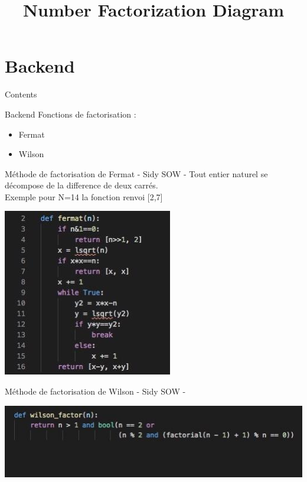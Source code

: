 \documentclass[aspectratio=169]{beamer}
\title{Number Factorization Diagram}
\begin{document}
\section{Backend}
\begin{frame}
	\maketitle 
\end{frame}

\begin{frame}{Contents}
	\tableofcontents 
\end{frame}

\begin{frame}[fragile=singleslide]{Backend}
	Fonctions de factorisation :
	\begin{itemize}
		\item Fermat 
		\item Wilson
	\end{itemize}
	\end{frame}
	\begin{frame}[fragile=singleslide]{Méthode de factorisation de Fermat \qquad \qquad \qquad - Sidy SOW -}
	Tout entier naturel se décompose de la difference de deux carrés.\\
	Exemple pour N=14 la fonction renvoi [2,7]
\begin{center}
    \includegraphics[scale=0.7]{ferma.jpg}
    \end{center}
\end{frame}
\begin{frame}[fragile=singleslide]{Méthode de factorisation de Wilson \qquad \qquad \qquad - Sidy SOW -}
\begin{center}
    \includegraphics[scale=0.5]{wilson.jpg}
\end{center}
\end{frame}
\end{document}
